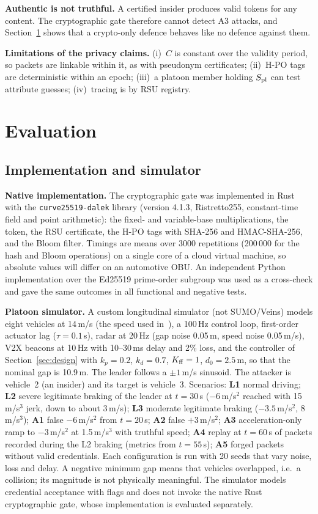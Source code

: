 \documentclass[journal]{IEEEtran}
\begin{document}
\textbf{Authentic is not truthful.} A certified insider produces valid tokens for any content. The cryptographic gate therefore cannot detect A3 attacks, and Section~\ref{sec:eval} shows that a crypto-only defence behaves like no defence against them.

\textbf{Limitations of the privacy claims.} (i)~$C$ is constant over the validity period, so packets are linkable within it, as with pseudonym certificates; (ii)~H-PO tags are deterministic within an epoch; (iii)~a platoon member holding $S_{\rm pl}$ can test attribute guesses; (iv)~tracing is by RSU registry.

\section{Evaluation}\label{sec:eval}
\subsection{Implementation and simulator}
\textbf{Native implementation.} The cryptographic gate was implemented in Rust with the \texttt{curve25519-dalek} library (version 4.1.3, Ristretto255, constant-time field and point arithmetic): the fixed- and variable-base multiplications, the token, the RSU certificate, the H-PO tags with SHA-256 and HMAC-SHA-256, and the Bloom filter. Timings are means over 3000 repetitions (200\,000 for the hash and Bloom operations) on a single core of a cloud virtual machine, so absolute values will differ on an automotive OBU. An independent Python implementation over the Ed25519 prime-order subgroup was used as a cross-check and gave the same outcomes in all functional and negative tests.

\textbf{Platoon simulator.} A custom longitudinal simulator (not SUMO/Veins) models eight vehicles at 14\,m/s (the speed used in~\cite{chen2026}), a 100\,Hz control loop, first-order actuator lag ($\tau=0.1$\,s), radar at 20\,Hz (gap noise 0.05\,m, speed noise 0.05\,m/s), V2X beacons at 10\,Hz with 10--30\,ms delay and 2\% loss, and the controller of Section~\ref{sec:design} with $k_p=0.2$, $k_d=0.7$, $K_{\rm ff}=1$, $d_0=2.5$\,m, so that the nominal gap is 10.9\,m. The leader follows a $\pm1$\,m/s sinusoid. The attacker is vehicle~2 (an insider) and its target is vehicle~3. Scenarios: \textbf{L1} normal driving; \textbf{L2} severe legitimate braking of the leader at $t=30$\,s ($-6$\,m/s$^2$ reached with 15\,m/s$^3$ jerk, down to about 3\,m/s); \textbf{L3} moderate legitimate braking ($-3.5$\,m/s$^2$, 8\,m/s$^3$); \textbf{A1} false $-6$\,m/s$^2$ from $t=20$\,s; \textbf{A2} false $+3$\,m/s$^2$; \textbf{A3} acceleration-only ramp to $-3$\,m/s$^2$ at 1.5\,m/s$^3$ with truthful speed; \textbf{A4} replay at $t=60$\,s of packets recorded during the L2 braking (metrics from $t=55$\,s); \textbf{A5} forged packets without valid credentials. Each configuration is run with 20 seeds that vary noise, loss and delay. A negative minimum gap means that vehicles overlapped, i.e.\ a collision; its magnitude is not physically meaningful. The simulator models credential acceptance with flags and does not invoke the native Rust cryptographic gate, whose implementation is evaluated separately.
\end{document}
